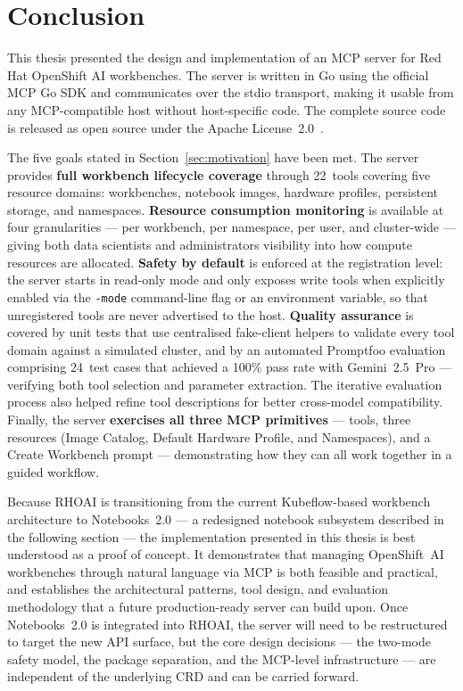 \documentclass[
  digital,     %
  oneside,     %
  nosansbold,  %
  nocolorbold, %
  lof,         %
  lot,         %
]{fithesis4}
\begin{document}
\chapter{Conclusion}
\label{chap:conclusion}

This thesis presented the design and implementation of an MCP server for
Red Hat OpenShift AI workbenches. The server is written in Go using the
official MCP Go SDK and communicates over the stdio transport, making it
usable from any MCP-compatible host without host-specific code. The
complete source code is released as open source under the Apache
License~2.0~\parencite{mcp-server-rhoai-repo}.

The five goals stated in Section~\ref{sec:motivation} have been met.
The server provides \textbf{full workbench lifecycle coverage} through
22~tools covering five resource domains: workbenches, notebook images,
hardware profiles, persistent storage, and namespaces.
\textbf{Resource consumption monitoring} is available at four
granularities --- per workbench, per namespace, per user, and
cluster-wide --- giving both data scientists and administrators
visibility into how compute resources are allocated.
\textbf{Safety by default} is enforced at the registration level: the
server starts in read-only mode and only exposes write tools when
explicitly enabled via the \texttt{-mode} command-line flag or an
environment variable, so that unregistered tools are never advertised to
the host. \textbf{Quality assurance} is covered by unit tests that use
centralised fake-client helpers to validate every tool domain against a
simulated cluster, and by an automated Promptfoo evaluation comprising
24~test cases that achieved a 100\% pass rate with Gemini~2.5~Pro ---
verifying both tool selection and parameter extraction. The iterative
evaluation process also helped refine tool descriptions for better
cross-model compatibility. Finally, the server \textbf{exercises all three
MCP primitives} --- tools, three resources (Image Catalog, Default
Hardware Profile, and Namespaces), and a Create Workbench prompt --- demonstrating
how they can all work together in a guided workflow.

Because RHOAI is transitioning from the current Kubeflow-based
workbench architecture to Notebooks~2.0 --- a redesigned notebook
subsystem described in the following section --- the implementation
presented in this thesis is best understood as a proof of concept. It
demonstrates that managing OpenShift~AI workbenches through natural
language via MCP is both feasible and practical, and establishes the
architectural patterns, tool design, and evaluation methodology that a
future production-ready server can build upon. Once Notebooks~2.0 is
integrated into RHOAI, the server will need to be restructured to
target the new API surface, but the core design decisions --- the
two-mode safety model, the package separation, and the MCP-level
infrastructure --- are independent of the underlying CRD and can be
carried forward.
\end{document}
